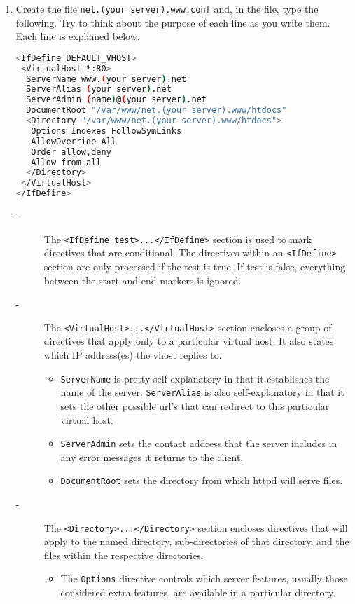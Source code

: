 \documentclass[11pt]{article}
\begin{document}
\begin{enumerate}
  \item Create the file \verb|net.(your server).www.conf| and, in the file, type the following. Try to think about the purpose of each line as you write them. Each line is explained below.
  \begin{lstlisting}[basicstyle=\ttfamily, backgroundcolor = \color{lightgray}, language = bash, xleftmargin = 0cm, framexleftmargin = 1em, framexrightmargin = 3em, showstringspaces=false] 
<IfDefine DEFAULT_VHOST>
 <VirtualHost *:80>
  ServerName www.(your server).net
  ServerAlias (your server).net
  ServerAdmin (name)@(your server).net
  DocumentRoot "/var/www/net.(your server).www/htdocs"
  <Directory "/var/www/net.(your server).www/htdocs">
   Options Indexes FollowSymLinks
   AllowOverride All
   Order allow,deny
   Allow from all
  </Directory>
 </VirtualHost>
</IfDefine>
\end{lstlisting}
    \begin{description}
      \item[-] The \verb|<IfDefine test>...</IfDefine>| section is used to mark directives that are conditional. The directives within an \verb|<IfDefine>| section are only processed if the test is true. If test is false, everything between the start and end markers is ignored.
      \item[-] The \verb|<VirtualHost>...</VirtualHost>| section encloses a group of directives that apply only to a particular virtual host. It also states which IP address(es) the vhost replies to.
      \begin{itemize}
        \item \verb|ServerName| is pretty self-explanatory in that it establishes the name of the server. \verb|ServerAlias| is also self-explanatory in that it sets the other possible url's that can redirect to this particular virtual host.
        \item \verb|ServerAdmin| sets the contact address that the server includes in any error messages it returns to the client.
        \item \verb|DocumentRoot| sets the directory from which httpd will serve files.
      \end{itemize}
      \item[-] The \verb|<Directory>...</Directory>| section encloses directives that will apply to the named directory, sub-directories of that directory, and the files within the respective directories.
      \begin{itemize}
        \item The \verb|Options| directive controls which server features, usually those considered extra features, are available in a particular directory.

\end{itemize}
\end{description}
\end{enumerate}
\end{document}
